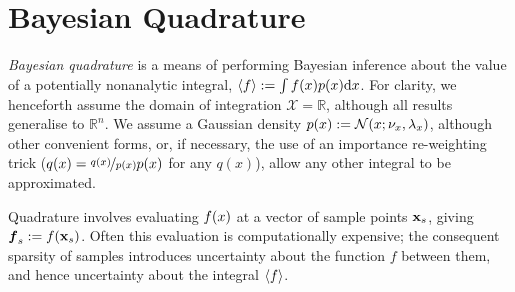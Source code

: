 \documentclass{article} %
\begin{document}
\section{Bayesian Quadrature} \label{sec:bq}


\emph{Bayesian quadrature} \cite{BZHermiteQuadrature,BZMonteCarlo} is a means of performing Bayesian inference about the value of a potentially nonanalytic integral, $\inty{f} \deq \int f(x) p(x) \ud x$. For clarity, we henceforth assume the domain of integration $\mathcal{X} = \mathbb{R}$, although all results generalise to $\mathbb{R}^n$.
We assume a Gaussian density
$\po{\lfv} \deq \N{\lfv}{\nu_{\lfv}}{\lambda_{\lfv}}$,
although other convenient forms, or, if necessary, the use of an importance re-weighting trick ($q(x) = \nicefrac{q(x)}{p(x)} p(x)$ for any $q(x)$), allow any other integral to be approximated. 

Quadrature involves evaluating $f(\lfv)$ at a vector of sample points $\vlfv_s$, giving $\vf\pha_s\deq f(\vlfv_s)$. Often this evaluation is computationally expensive; the consequent sparsity of samples introduces uncertainty about the function $f$ between them, and hence uncertainty about the integral $\inty{f}$.


\end{document}
